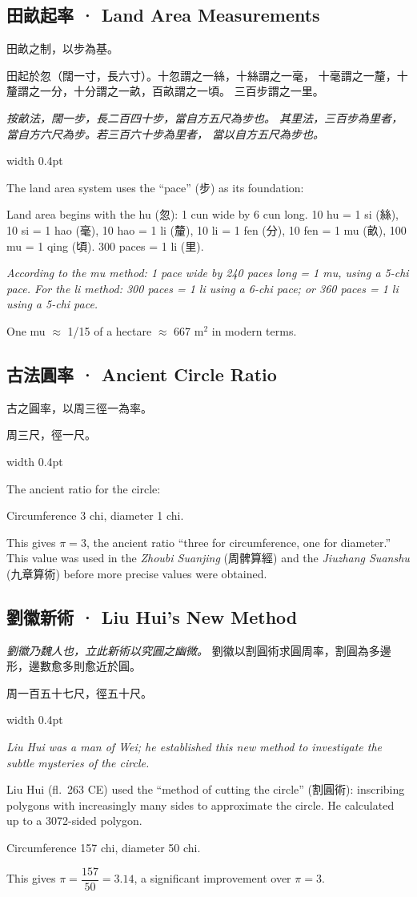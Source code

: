 \documentclass[10pt,a4paper]{article}
\newlength{\cnwidth}
\newlength{\enwidth}
\newcommand{\bilingual}[2]{%
  \noindent%
  \begin{minipage}[t]{\cnwidth}%
    #1%
  \end{minipage}%
  \hfill\vrule width 0.4pt\hfill%
  \begin{minipage}[t]{\enwidth}%
    #2%
  \end{minipage}%
  \par\smallskip%
}
\newcommand{\bilingualsubsection}[2]{%
  \subsection*{#1 · #2}
}
\begin{document}
\bilingualsubsection{田畝起率}{Land Area Measurements}

\bilingual{%
  田畝之制，以步為基。

  田起於忽（闊一寸，長六寸）。十忽謂之一絲，十絲謂之一毫，
  十毫謂之一釐，十釐謂之一分，十分謂之一畝，百畝謂之一頃。
  三百步謂之一里。

  \textit{按畝法，闊一步，長二百四十步，當自方五尺為步也。
  其里法，三百步為里者，當自方六尺為步。若三百六十步為里者，
  當以自方五尺為步也。}
}{%
  The land area system uses the ``pace'' (步) as its foundation:

  Land area begins with the hu (忽): 1 cun wide by 6 cun long.
  10 hu = 1 si (絲), 10 si = 1 hao (毫),
  10 hao = 1 li (釐), 10 li = 1 fen (分),
  10 fen = 1 mu (畝), 100 mu = 1 qing (頃).
  300 paces = 1 li (里).

  \textit{According to the mu method: 1 pace wide by 240 paces long = 1 mu,
  using a 5-chi pace. For the li method: 300 paces = 1 li using a 6-chi pace;
  or 360 paces = 1 li using a 5-chi pace.}

  One mu $\approx$ 1/15 of a hectare $\approx$ 667 m$^2$ in modern terms.
}


\bilingualsubsection{古法圓率}{Ancient Circle Ratio}

\bilingual{%
  古之圓率，以周三徑一為率。

  周三尺，徑一尺。
}{%
  The ancient ratio for the circle:

  Circumference 3 chi, diameter 1 chi.

  This gives $\pi = 3$, the ancient ratio ``three for circumference, one for diameter.''
  This value was used in the \textit{Zhoubi Suanjing} (周髀算經) and the
  \textit{Jiuzhang Suanshu} (九章算術) before more precise values were obtained.
}

\bilingualsubsection{劉徽新術}{Liu Hui's New Method}

\bilingual{%
  \textit{劉徽乃魏人也，立此新術以究圓之幽微。}
  劉徽以割圓術求圓周率，割圓為多邊形，邊數愈多則愈近於圓。

  周一百五十七尺，徑五十尺。
}{%
  \textit{Liu Hui was a man of Wei; he established this new method to investigate
  the subtle mysteries of the circle.}

  Liu Hui (fl.\ 263 CE) used the ``method of cutting the circle'' (割圓術):
  inscribing polygons with increasingly many sides to approximate the circle.
  He calculated up to a 3072-sided polygon.

  Circumference 157 chi, diameter 50 chi.

  This gives $\pi = \dfrac{157}{50} = 3.14$, a significant improvement over $\pi = 3$.
}
\end{document}
